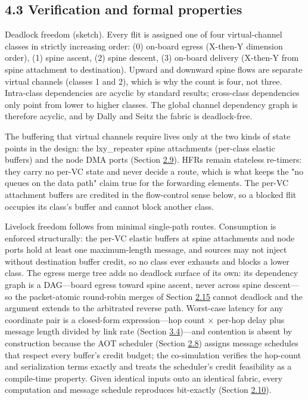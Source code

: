 \documentclass[12pt,onecolumn]{article}
\begin{document}
\subsection*{4.3 Verification and formal properties}\label{sec:4.3}

Deadlock freedom (sketch). Every flit is assigned one of four virtual-channel classes in strictly increasing order: (0) on-board egress (X-then-Y dimension order), (1) spine ascent, (2) spine descent, (3) on-board delivery (X-then-Y from spine attachment to destination). Upward and downward spine flows are separate virtual channels (classes 1 and 2), which is why the count is four, not three. Intra-class dependencies are acyclic by standard results; cross-class dependencies only point from lower to higher classes. The global channel dependency graph is therefore acyclic, and by Dally and Seitz the fabric is deadlock-free\cite{13,14}.

The buffering that virtual channels require lives only at the two kinds of state points in the design: the lxy\_repeater spine attachments (per-class elastic buffers) and the node DMA ports (Section \hyperref[sec:2.9]{2.9}). HFRs remain stateless re-timers: they carry no per-VC state and never decide a route, which is what keeps the "no queues on the data path" claim true for the forwarding elements. The per-VC attachment buffers are credited in the flow-control sense below, so a blocked flit occupies its class's buffer and cannot block another class.

Livelock freedom follows from minimal single-path routes. Consumption is enforced structurally: the per-VC elastic buffers at spine attachments and node ports hold at least one maximum-length message, and sources may not inject without destination buffer credit, so no class ever exhausts and blocks a lower class. The egress merge tree adds no deadlock surface of its own: its dependency graph is a DAG---board egress toward spine ascent, never across spine descent---so the packet-atomic round-robin merges of Section \hyperref[sec:2.15]{2.15} cannot deadlock and the argument extends to the arbitrated reverse path. Worst-case latency for any coordinate pair is a closed-form expression---hop count $\times$ per-hop delay plus message length divided by link rate (Section \hyperref[sec:3.4]{3.4})---and contention is absent by construction because the AOT scheduler (Section \hyperref[sec:2.8]{2.8}) assigns message schedules that respect every buffer's credit budget; the co-simulation verifies the hop-count and serialization terms exactly and treats the scheduler's credit feasibility as a compile-time property. Given identical inputs onto an identical fabric, every computation and message schedule reproduces bit-exactly (Section \hyperref[sec:2.10]{2.10}).
\end{document}
